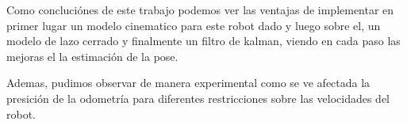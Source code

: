 Como concluciónes de este trabajo podemos ver las ventajas de implementar en primer lugar un modelo cinematico para este robot dado y luego sobre el, un modelo de lazo cerrado y finalmente un filtro de kalman, viendo en cada paso las mejoras el la estimación de la pose.

Ademas, pudimos observar de manera experimental como se ve afectada la presición de la odometría para diferentes restricciones sobre las velocidades del robot.